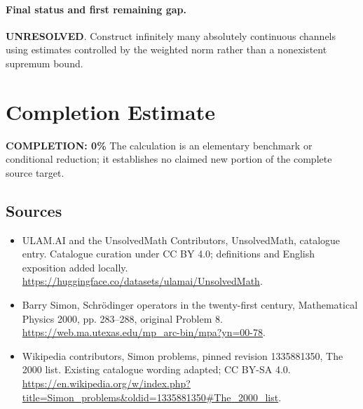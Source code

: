 \documentclass[11pt]{article}
\begin{document}
\paragraph{Final status and first remaining gap.}
\textbf{UNRESOLVED}. Construct infinitely many absolutely continuous channels using estimates controlled by the weighted norm rather than a nonexistent supremum bound.

\section{Completion Estimate}
\noindent\textbf{COMPLETION: 0\%}
The calculation is an elementary benchmark or conditional reduction; it establishes no claimed new portion of the complete source target.

\subsection{Sources}
\begin{itemize}
\item[\hypertarget{source:statement:1}{S1}] ULAM.AI and the UnsolvedMath Contributors, UnsolvedMath, catalogue entry. Catalogue curation under CC BY 4.0; definitions and English exposition added locally.
\url{https://huggingface.co/datasets/ulamai/UnsolvedMath}.
\item[\hypertarget{source:statement:2}{S2}] Barry Simon, Schrödinger operators in the twenty-first century, Mathematical Physics 2000, pp. 283–288, original Problem 8.
\url{https://web.ma.utexas.edu/mp_arc-bin/mpa?yn=00-78}.
\item[\hypertarget{source:statement:3}{S3}] Wikipedia contributors, Simon problems, pinned revision 1335881350, The 2000 list. Existing catalogue wording adapted; CC BY-SA 4.0.
\url{https://en.wikipedia.org/w/index.php?title=Simon_problems&oldid=1335881350#The_2000_list}.
\end{itemize}
\label{end:statement}
\end{document}
